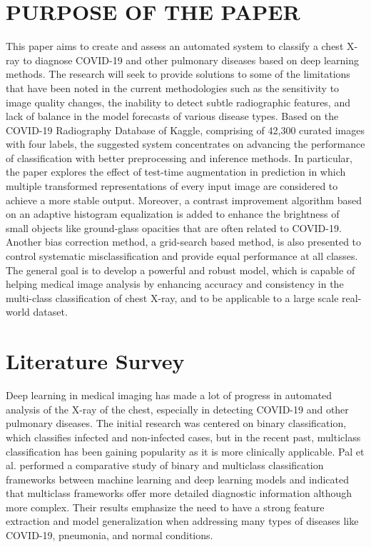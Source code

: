 \documentclass[a4paper,fleqn]{cas-dc}
\begin{document}
\section{PURPOSE OF THE PAPER}
This paper aims to create and assess an automated system to classify a chest X-ray to diagnose COVID-19 and other pulmonary diseases based on deep learning methods. The research will seek to provide solutions to some of the limitations that have been noted in the current methodologies such as the sensitivity to image quality changes, the inability to detect subtle radiographic features, and lack of balance in the model forecasts of various disease types. Based on the COVID-19 Radiography Database of Kaggle, comprising of 42,300 curated images with four labels, the suggested system concentrates on advancing the performance of classification with better preprocessing and inference methods. In particular, the paper explores the effect of test-time augmentation in prediction in which multiple transformed representations of every input image are considered to achieve a more stable output. Moreover, a contrast improvement algorithm based on an adaptive histogram equalization is added to enhance the brightness of small objects like ground-glass opacities that are often related to COVID-19. Another bias correction method, a grid-search based method, is also presented to control systematic misclassification and provide equal performance at all classes. The general goal is to develop a powerful and robust model, which is capable of helping medical image analysis by enhancing accuracy and consistency in the multi-class classification of chest X-ray, and to be applicable to a large scale real-world dataset.

\section{Literature Survey}
Deep learning in medical imaging has made a lot of progress in automated analysis of the X-ray of the chest, especially in detecting COVID-19 and other pulmonary diseases. The initial research was centered on binary classification, which classifies infected and non-infected cases, but in the recent past, multiclass classification has been gaining popularity as it is more clinically applicable. Pal et al. \cite{ref1} performed a comparative study of binary and multiclass classification frameworks between machine learning and deep learning models and indicated that multiclass frameworks offer more detailed diagnostic information although more complex. Their results emphasize the need to have a strong feature extraction and model generalization when addressing many types of diseases like COVID-19, pneumonia, and normal conditions.
\end{document}
